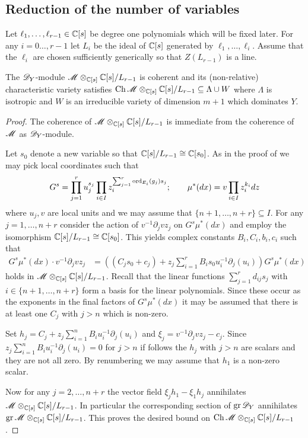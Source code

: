   \subsection{Reduction of the number of variables}
  Let $\ell_1,\ldots,\ell_{r-1}\in \mathbb{C}[s]$ be degree one polynomials which will be fixed later.
  For any $i=0\ldots,r-1$ let $L_i$ be the ideal of $\mathbb{C}[s]$ generated by $\ell_1,\ldots,\ell_i$.
  Assume that the $\ell_i$ are chosen sufficiently generically so that $Z(L_{r-1})$ is a line.
  \begin{proposition}\label{prop: CharVarEstimateW}
    The $\mathscr{D}_Y$-module $\mathscr{M}\otimes_{\mathbb{C}[s]}\mathbb{C}[s]/L_{r-1}$ is coherent and its (non-relative) characteristic variety satisfies $\operatorname{Ch}\mathscr{M}\otimes_{\mathbb{C}[s]}\mathbb{C}[s]/L_{r-1} \subseteq \Lambda \cup W $ where $\Lambda$ is isotropic and $W$ is an irreducible variety of dimension $m +1$ which dominates $Y$.
\end{proposition}
\begin{proof}
  The coherence of $\mathscr{M}\otimes_{\mathbb{C}[s]}\mathbb{C}[s]/L_{r-1}$ is immediate from the coherence of $\mathscr{M}$ as $\mathscr{D}_Y$-module.

  Let $s_0$ denote a new variable so that $\mathbb{C}[s]/L_{r-1}\cong \mathbb{C}[s_0]$. As in the proof of  we may pick local coordinates such that
  $$G^s = \prod_{j=1}^r u_j^{s_j} \prod_{i\in I} z_i^{\sum_{j=1}^r   \operatorname{ord}_{E_i}(g_j)s_j};\qquad \mu^*(dx) = v \prod_{i\in I} z_i^{k_i} dz$$
  where $u_j, v$ are local units and we may assume that $\{n+1,\ldots,n+r\}\subseteq I$.
  For any $j=1,\ldots,n+r$ consider the action of $v^{-1}\partial_j v z_j$ on $G^s \mu^*(dx)$ and employ the isomorphism $\mathbb{C}[s]/L_{r-1}\cong \mathbb{C}[s_0]$.
  This yields complex constants $B_i,C_i,b_i,c_i$ such that
  \begin{align*}
    G^s \mu^*(dx) \cdot v^{-1}\partial_j vz_j &=((C_j s_0 + c_j) + z_j\sum_{i=1}^{r} B_i s_0 u_i^{-1}\partial_j(u_i) ) G^s \mu^*(dx)
  \end{align*}
  holds in $\mathscr{M}\otimes_{\mathbb{C}[s]}\mathbb{C}[s]/L_{r-1}$.
  Recall that the linear functions $\sum_{j=1}^r d_{ij}s_j$ with $i \in \{n+1,\ldots,n+r\}$ form a basis for the linear polynomials.
  Since these occur as the exponents in the final factors of  $G^s\mu^*(dx)$ it may be assumed that there is at least one $C_{j}$ with $j>n$ which is non-zero.

  Set $h_j = C_j + z_j\sum_{i=1}^n B_iu_i^{-1}\partial_j(u_i)$ and $\xi_j= v^{-1}\partial_j vz_j - c_j$. Since $ z_j\sum_{i=1}^n B_iu_i^{-1}\partial_j(u_i) = 0$ for $j>n$ if follows the $h_{j}$ with $j>n$ are scalars and they are not all zero.
  By renumbering we may assume that $h_1$ is a non-zero scalar.

  Now for any $j=2,\ldots,n+r$ the vector field $\xi_j h_1 - \xi_1 h_j$ annihilates $\mathscr{M}\otimes_{\mathbb{C}[s]}\mathbb{C}[s]/L_{r-1}$.
  In particular the corresponding section of $\operatorname{gr} \mathscr{D}_Y$ annihilates $\operatorname{gr}\mathscr{M}\otimes_{\mathbb{C}[s]}\mathbb{C}[s]/L_{r-1}$.
  This proves the desired bound on $\operatorname{Ch} \mathscr{M}\otimes_{\mathbb{C}[s]}\mathbb{C}[s]/L_{r-1}$.
\end{proof}
